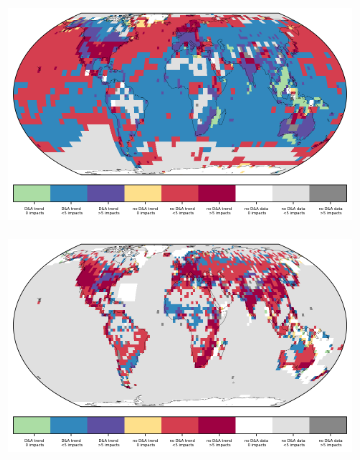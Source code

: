 \documentclass{article}
\begin{document}
\begin{figure}
	\begin{subfigure}{.5\textwidth}
		\includegraphics[width=\linewidth]{../plots/maps/gridcells_da_studies_temp_2_5_global.png}
	\end{subfigure}
	\begin{subfigure}{.5\textwidth}
		\includegraphics[width=\linewidth]{../plots/maps/gridcells_da_studies_precip_2_5_global.png}
	\end{subfigure}

	\end{figure}
	
	
	
\end{document}
